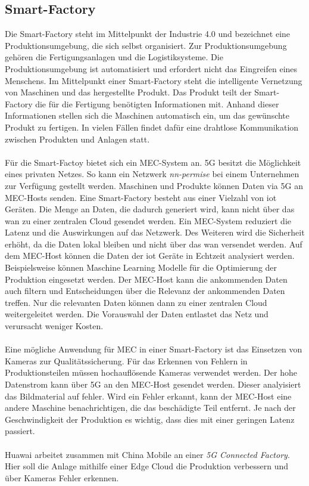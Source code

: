 \documentclass[runningheads]{llncs}
\numberwithin{figure}{section}
\begin{document}
\subsection{Smart-Factory}
Die Smart-Factory steht im Mittelpunkt der Industrie 4.0 und bezeichnet eine Produktionsumgebung, die sich selbst organisiert. 
Zur Produktionsumgebung gehören die Fertigungsanlagen und die Logistiksysteme. Die Produktionsumgebung ist automatisiert und erfordert
nicht das Eingreifen eines Menschens. 
Im Mittelpunkt einer Smart-Factory steht die intelligente Vernetzung von Maschinen und das hergestellte Produkt. 
Das Produkt teilt der Smart-Factory die für die Fertigung benötigten Informationen mit. 
Anhand dieser Informationen stellen sich die Maschinen automatisch ein, um das gewünschte Produkt zu fertigen. 
In vielen Fällen findet dafür eine drahtlose Kommunikation zwischen Produkten und Anlagen statt.  \cite{gundall5GEnablerIndustrie2018}
\\
\\
Für die Smart-Factoy bietet sich ein MEC-System an. 5G besitzt die Möglichkeit eines privaten Netzes. 
So kann ein Netzwerk \textit{nn-permise} bei einem Unternehmen zur Verfügung gestellt werden. 
Maschinen und Produkte können Daten via 5G an MEC-Hosts senden.
Eine Smart-Factory besteht aus einer Vielzahl von \acrfull{iot} Geräten. Die Menge an Daten, die dadurch 
generiert wird, kann nicht über das \acrshort{wan} zu einer zentralen Cloud gesendet werden. Ein MEC-System reduziert die Latenz
und die Auswirkungen auf das Netzwerk. Des Weiteren wird die Sicherheit erhöht, da die Daten lokal bleiben und nicht über 
das \acrshort{wan} versendet werden. Auf dem MEC-Host können die Daten der \acrshort{iot} Geräte in Echtzeit analysiert werden. Beispielsweise können
Maschine Learning Modelle für die Optimierung der Produktion eingesetzt werden. Der MEC-Host kann die ankommenden Daten auch filtern und Entscheidungen über
die Relevanz der ankommenden Daten treffen. Nur die relevanten Daten können dann zu einer zentralen Cloud weitergeleitet werden. Die Vorauswahl der Daten entlastet
das Netz und verursacht weniger Kosten.
\\
\\
Eine mögliche Anwendung für MEC in einer Smart-Factory ist das Einsetzen von Kameras zur Qualitätssicherung.
Für das Erkennen von Fehlern in Produktionsteilen müssen hochauflösende Kameras verwendet werden. Der hohe Datenstrom
kann über 5G an den MEC-Host gesendet werden. Dieser analyisiert das Bildmaterial auf fehler. Wird ein Fehler erkannt,
kann der MEC-Host eine andere Maschine benachrichtigen, die das beschädigte Teil entfernt. Je nach der Geschwindigkeit der Produktion
es wichtig, dass dies mit einer geringen Latenz passiert. \cite{etsiMultiaccessEdgeComputing}
\\
\\
Huawai arbeitet zusammen mit China Mobile an einer \textit{5G Connected Factory}. Hier soll die Anlage mithilfe 
einer Edge Cloud die Produktion verbessern und über Kameras Fehler erkennen. \cite{WhatNextgenFactory}
\end{document}
